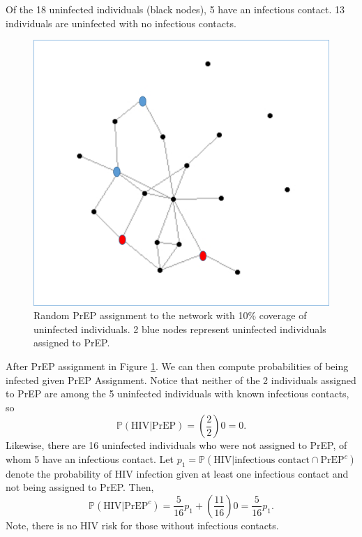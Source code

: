 \documentclass{article}
\theoremstyle{definition}
\begin{document}
 Of the 18 uninfected individuals (black nodes), 5 have an infectious contact. 13 individuals are uninfected with no infectious contacts.
\begin{figure}[H]
    \centering
    \includegraphics[scale=0.5]{Network Example 2.png}
    \caption{Random PrEP assignment to the network with 10\% coverage of uninfected individuals. 2 blue nodes represent uninfected individuals assigned to PrEP.}
    \label{fig:Figure 3}
\end{figure}

After PrEP assignment in Figure \ref{fig:Figure 3}. We can then compute probabilities of being infected given PrEP Assignment. Notice that neither of the 2 individuals assigned to PrEP are among the 5 uninfected individuals with known infectious contacts, so $$\mathbb{P}\left(\text{HIV}\vert \text{PrEP}\right)=\left(\frac{2}{2}\right)0=0.$$
Likewise, there are 16 uninfected individuals who were not assigned to PrEP, of whom 5 have an infectious contact. Let $p_{1}=\mathbb{P}\left(\text{HIV} \vert \text{infectious contact} \cap \text{PrEP}^{c}\right)$ denote the probability of HIV infection given at least one infectious contact and not being assigned to PrEP.  Then, $$\mathbb{P}\left(\text{HIV} \vert \text{PrEP}^c\right)=\frac{5}{16}p_{1}+\left(\frac{11}{16}\right)0=\frac{5}{16}p_{1}.$$ Note, there is no HIV risk for those without infectious contacts.
\end{document}

